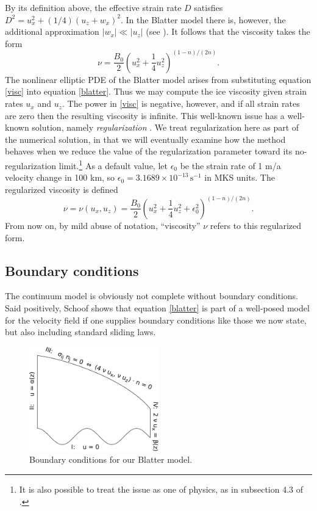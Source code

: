 \documentclass[11pt,final,reqno]{amsart}
\theoremstyle{remark}
\theoremstyle{definition}
\newcommand{\eps}{\epsilon}
\begin{document}
By its definition above, the effective strain rate $D$ satisfies $D^2 = u_x^2 + (1/4)\left(u_z + w_x\right)^2.$  In the Blatter model there is, however, the additional approximation $|w_x| \ll |u_z|$ (see \cite{GreveBlatter2009,Pattyn03}).  It follows that the viscosity takes the form
\begin{equation}
\nu = \frac{B_0}{2} \left(u_x^2 + \frac{1}{4}u_z^2\right)^{(1-n)/(2n)}. \label{visc}
\end{equation}
The nonlinear elliptic PDE of the Blatter model arises from substituting equation \eqref{visc} into equation \eqref{blatter}.  Thus we may compute the ice viscosity given strain rates $u_x$ and $u_z$.  The power in \eqref{visc} is negative, however, and if all strain rates are zero then the resulting viscosity is infinite.  This well-known issue has a well-known solution, namely \emph{regularization} \cite{Pattyn03,SchoofCoulombBlatter}.  We treat regularization here as part of the numerical solution, in that we will eventually examine how the method behaves when we reduce the value of the regularization parameter toward its no-regularization limit.\footnote{It is also possible to treat the issue as one of physics, as in subsection 4.3 of \cite{GreveBlatter2009}.}  As a default value, let $\eps_0$ be the strain rate of 1 m/a velocity change in 100 km, so $\eps_0 = 3.1689 \times 10^{-13} \,\text{s}^{-1}$ in MKS units.  The regularized viscosity is defined
\begin{equation}
\nu = \nu(u_x,u_z) = \frac{B_0}{2} \left(u_x^2 + \frac{1}{4}u_z^2 + \eps_0^2\right)^{(1-n)/(2n)}. \label{viscreg}
\end{equation}
From now on, by mild abuse of notation, ``viscosity'' $\nu$ refers to this regularized form.  

\subsection*{Boundary conditions}  The continuum model is obviously not complete without boundary conditions.  Said positively, Schoof \cite{SchoofCoulombBlatter} shows that equation \eqref{blatter} is part of a well-posed model for the velocity field if one supplies boundary conditions like those we now state, but also including standard sliding laws.  

\begin{figure}[ht] 
\includegraphics[width=0.50\textwidth]{figs/bdryblatter}
\caption{Boundary conditions for our Blatter model.}
\label{fig:bdryblatter}
\end{figure}
\end{document}
